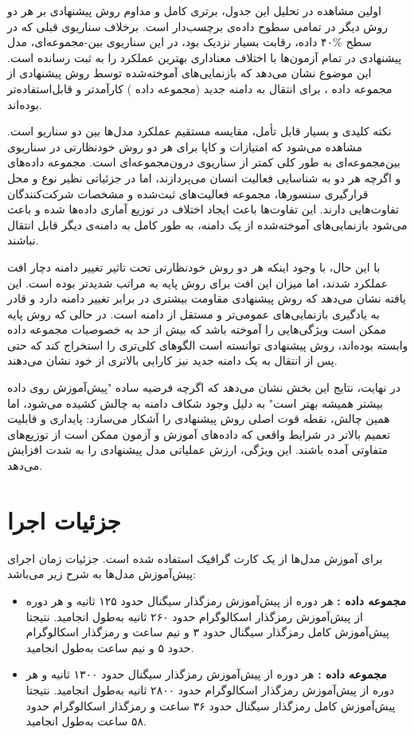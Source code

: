 اولین مشاهده در تحلیل این جدول، برتری کامل و مداوم روش پیشنهادی بر هر دو روش دیگر در تمامی سطوح داده‌ی برچسب‌دار است. برخلاف سناریوی قبلی که در سطح \%۴۰ داده، رقابت بسیار نزدیک بود، در این سناریوی بین-مجموعه‌ای، مدل پیشنهادی در تمام آزمون‌ها با اختلاف معناداری بهترین عملکرد را به ثبت رسانده است. این موضوع نشان می‌دهد که بازنمایی‌های آموخته‌شده توسط روش پیشنهادی از مجموعه داده ، برای انتقال به دامنه جدید (مجموعه داده ) کارآمدتر و قابل‌استفاده‌تر بوده‌اند.

نکته کلیدی و بسیار قابل تأمل، مقایسه مستقیم عملکرد مدل‌ها بین دو سناریو است. مشاهده می‌شود که امتیازات  و کاپا برای هر دو روش خودنظارتی در سناریوی بین‌مجموعه‌ای به طور کلی کمتر از سناریوی درون‌مجموعه‌ای است. مجموعه داده‌های  و  اگرچه هر دو به شناسایی فعالیت انسان می‌پردازند، اما در جزئیاتی نظیر
نوع و محل قرارگیری سنسورها، مجموعه فعالیت‌های ثبت‌شده و مشخصات شرکت‌کنندگان تفاوت‌هایی دارند. این تفاوت‌ها باعث ایجاد اختلاف در توزیع آماری داده‌ها شده و باعث می‌شود بازنمایی‌های آموخته‌شده از یک دامنه، به طور کامل به دامنه‌ی دیگر قابل انتقال نباشند.

با این حال، با وجود اینکه هر دو روش خودنظارتی تحت تاثیر تغییر دامنه دچار افت عملکرد شدند، اما میزان این افت برای روش پایه به مراتب شدیدتر بوده است. این یافته نشان می‌دهد که روش پیشنهادی مقاومت بیشتری در برابر تغییر دامنه دارد و قادر به یادگیری بازنمایی‌های عمومی‌تر و مستقل از دامنه است. در حالی که روش پایه ممکن است ویژگی‌هایی را آموخته باشد که بیش از حد به خصوصیات مجموعه داده  وابسته بوده‌اند، روش پیشنهادی توانسته است الگوهای کلی‌تری را استخراج کند که حتی پس از انتقال به یک دامنه جدید نیز کارایی بالاتری از خود نشان می‌دهند.

در نهایت، نتایج این بخش نشان می‌دهد که اگرچه فرضیه ساده "پیش‌آموزش روی داده بیشتر همیشه بهتر است" به دلیل وجود شکاف دامنه به چالش کشیده می‌شود، اما همین چالش، نقطه قوت اصلی روش پیشنهادی را آشکار می‌سازد: پایداری و قابلیت تعمیم بالاتر در شرایط واقعی که داده‌های آموزش و آزمون ممکن است از توزیع‌های متفاوتی آمده باشند. این ویژگی، ارزش عملیاتی مدل پیشنهادی را به شدت افزایش می‌دهد.

\section{جزئیات اجرا}

برای آموزش مدل‌ها از یک کارت گرافیک  استفاده شده است. جزئیات زمان اجرای پیش‌آموزش مدل‌ها به شرح زیر می‌باشد:
\begin{itemize}
    \item \textbf{مجموعه داده :} هر دوره از پیش‌آموزش رمزگذار سیگنال حدود ۱۲۵ ثانیه و هر دوره از پیش‌آموزش رمزگذار اسکالوگرام حدود ۲۶۰ ثانیه به‌طول انجامید. نتیجتا پیش‌آموزش کامل رمزگذار سیگنال حدود ۳ و نیم ساعت و رمزگذار اسکالوگرام حدود ۵ و نیم ساعت به‌طول انجامید.
    \item \textbf{مجموعه داده :} هر دوره از پیش‌آموزش رمزگذار سیگنال حدود ۱۳۰۰ ثانیه و هر دوره از پیش‌آموزش رمزگذار اسکالوگرام حدود ۲۸۰۰ ثانیه به‌طول انجامید. نتیجتا پیش‌آموزش کامل رمزگذار سیگنال حدود ۳۶ ساعت و رمزگذار اسکالوگرام حدود ۵۸ ساعت به‌طول انجامید.
\end{itemize}

